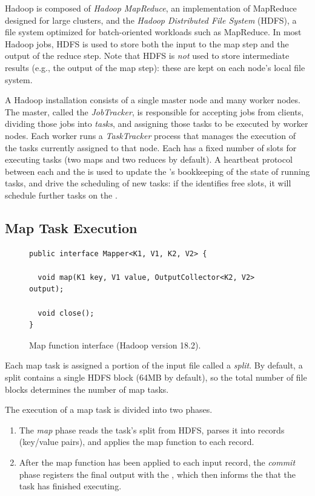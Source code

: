 Hadoop is composed of \emph{Hadoop MapReduce}, an implementation of MapReduce
designed for large clusters, and the \emph{Hadoop Distributed File System}
(HDFS), a file system optimized for batch-oriented workloads such as MapReduce.
In most Hadoop jobs, HDFS is used to store both the input to the map step and
the output of the reduce step.  Note that HDFS is \emph{not} used to store
intermediate results (e.g., the output of the map step): these are kept on each
node's local file system.

A Hadoop installation consists of a single master node and many worker nodes.
The master, called the \emph{JobTracker}, is responsible for accepting jobs
from clients, dividing those jobs into \emph{tasks}, and assigning those tasks
to be executed by worker nodes.  Each worker runs a \emph{TaskTracker} process
that manages the execution of the tasks currently assigned to that node.  Each
{\TT} has a fixed number of slots for executing tasks (two maps and two reduces
by default).  A heartbeat protocol between each {\TT} and the {\JT} is used to
update the {\JT}'s bookkeeping of the state of running tasks, and drive the
scheduling of new tasks: if the \JT identifies free {\TT} slots, it will
schedule further tasks on the {\TT}.

\subsection{Map Task Execution}
\label{ch:hadoop:sec:maptask}

\begin{figure}[t]
\ssp
\begin{minipage}{\linewidth}
\centering
\begin{verbatim}
public interface Mapper<K1, V1, K2, V2> {
  
  void map(K1 key, V1 value, OutputCollector<K2, V2> output);

  void close();
}
\end{verbatim}
\end{minipage}
\caption{Map function interface (Hadoop version 18.2).}
\label{fig:mapfunction}
\end{figure}

Each map task is assigned a portion of the input file called a \emph{split}.
By default, a split contains a single HDFS block (64MB by default), so the
total number of file blocks determines the number of map tasks.

The execution of a map task is divided into two phases.
\begin{enumerate}
\item
  The \emph{map} phase reads the task's split from HDFS, parses it into
  records (key/value pairs), and applies the map function to each
  record.
\item
  After the map function has been applied to each input record, the
  \emph{commit} phase registers the final output with the {\TT}, which
  then informs the {\JT} that the task has finished executing.
\end{enumerate}

